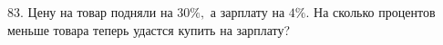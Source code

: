 83. Цену на товар подняли на $30\%,$ а зарплату на $4\%.$ На сколько процентов меньше товара теперь удастся купить на зарплату?\\
